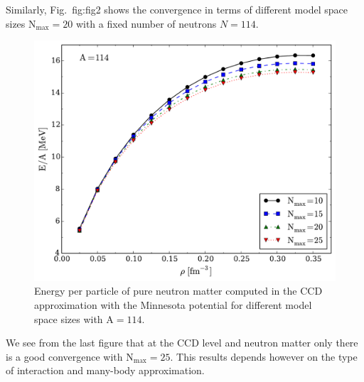 Similarly, Fig.~{fig:fig2} shows the convergence in terms of different model space sizes $\mathrm{N_{max}=20}$ with 
a fixed number of neutrons $N=114$. 
  \begin{figure}
    \includegraphics[width=\linewidth]{Chapter8-figures/fig2.pdf}
    \caption{Energy per particle of pure neutron matter computed in
      the CCD approximation with the Minnesota potential for different
      model space sizes with $\mathrm{A=114}$.}
    \label{fig:fig2}
  \end{figure}
We see from the last figure that at the CCD level and neutron matter only there is a good convergence with  $\mathrm{N_{max}=25}$.
This results depends however on the type of interaction and many-body approximation. 

